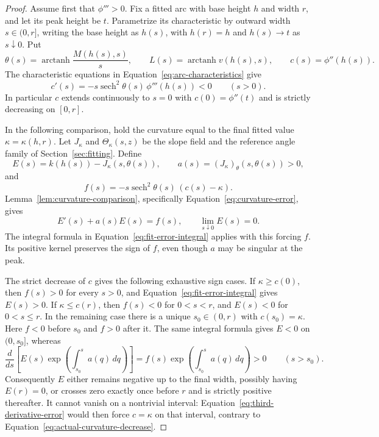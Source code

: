 \begin{proof}
Assume first that $\phi'''>0$.  Fix a fitted arc with base height $h$
and width $r$, and let its peak height be $t$.  Parametrize its
characteristic by outward width $s\in(0,r]$, writing the base height
as $h(s)$, with $h(r)=h$ and $h(s)\to t$ as $s\downarrow0$.  Put
\[
 \theta(s)=\operatorname{arctanh}\frac{M(h(s),s)}s,
 \qquad
 L(s)=\operatorname{arctanh}v(h(s),s),
 \qquad c(s)=\phi''(h(s)).
\]
The characteristic equations in
Equation~\eqref{eq:arc-characteristics} give
\begin{equation}\label{eq:actual-curvature-decrease}
 c'(s)=-s\operatorname{sech}^2\theta(s)\,
                       \phi'''(h(s))<0\qquad(s>0).
\end{equation}
In particular $c$ extends continuously to $s=0$ with $c(0)=\phi''(t)$
and is strictly decreasing on $[0,r]$.

In the following comparison, hold the curvature equal to the final
fitted value $\kappa=\kappa(h,r)$.  Let $J_\kappa$ and
$\Theta_\kappa(s,z)$ be the slope field and the reference angle
family of Section~\ref{sec:fitting}.  Define
\[
 E(s)=k(h(s))-J_\kappa(s,\theta(s)),\qquad
 a(s)=(J_\kappa)_\theta(s,\theta(s))>0,
\]
and
\[
 f(s)=-s\operatorname{sech}^2\theta(s)\,(c(s)-\kappa).
\]
Lemma~\ref{lem:curvature-comparison}, specifically
Equation~\eqref{eq:curvature-error}, gives
\begin{equation}\label{eq:third-derivative-error}
 E'(s)+a(s)E(s)=f(s),\qquad \lim_{s\downarrow0}E(s)=0.
\end{equation}
The integral formula in Equation~\eqref{eq:fit-error-integral}
applies with this forcing $f$. Its positive kernel preserves the
sign of $f$, even though $a$ may be singular at the peak.

The strict decrease of $c$ gives the following exhaustive sign cases.
If $\kappa\ge c(0)$, then $f(s)>0$ for every $s>0$, and
Equation~\eqref{eq:fit-error-integral} gives $E(s)>0$.
If $\kappa\le c(r)$, then $f(s)<0$ for $0<s<r$, and $E(s)<0$ for
$0<s\le r$.  In the remaining case there is a unique
$s_0\in(0,r)$ with $c(s_0)=\kappa$.  Here $f<0$ before $s_0$ and
$f>0$ after it.  The same integral formula gives $E<0$ on $(0,s_0]$,
whereas
\[
 \frac{d}{ds}\left[
 E(s)\exp\left(\int_{s_0}^s a(q)\,dq\right)\right]
 =f(s)\exp\left(\int_{s_0}^s a(q)\,dq\right)>0
 \qquad(s>s_0).
\]
Consequently $E$ either remains negative up to the final width,
possibly having $E(r)=0$, or crosses zero exactly once before $r$
and is strictly positive thereafter.  It cannot vanish on a
nontrivial interval: Equation~\eqref{eq:third-derivative-error} would
then force $c=\kappa$ on that interval, contrary to
Equation~\eqref{eq:actual-curvature-decrease}.


\end{proof}
